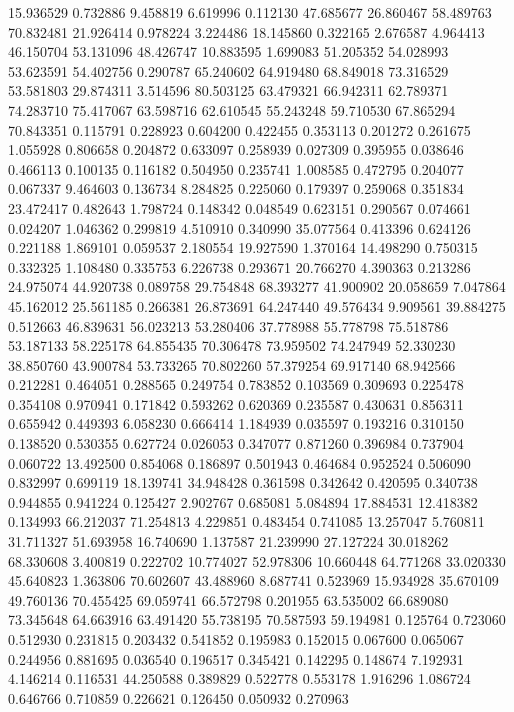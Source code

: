 15.936529
0.732886
9.458819
6.619996
0.112130
47.685677
26.860467
58.489763
70.832481
21.926414
0.978224
3.224486
18.145860
0.322165
2.676587
4.964413
46.150704
53.131096
48.426747
10.883595
1.699083
51.205352
54.028993
53.623591
54.402756
0.290787
65.240602
64.919480
68.849018
73.316529
53.581803
29.874311
3.514596
80.503125
63.479321
66.942311
62.789371
74.283710
75.417067
63.598716
62.610545
55.243248
59.710530
67.865294
70.843351
0.115791
0.228923
0.604200
0.422455
0.353113
0.201272
0.261675
1.055928
0.806658
0.204872
0.633097
0.258939
0.027309
0.395955
0.038646
0.466113
0.100135
0.116182
0.504950
0.235741
1.008585
0.472795
0.204077
0.067337
9.464603
0.136734
8.284825
0.225060
0.179397
0.259068
0.351834
23.472417
0.482643
1.798724
0.148342
0.048549
0.623151
0.290567
0.074661
0.024207
1.046362
0.299819
4.510910
0.340990
35.077564
0.413396
0.624126
0.221188
1.869101
0.059537
2.180554
19.927590
1.370164
14.498290
0.750315
0.332325
1.108480
0.335753
6.226738
0.293671
20.766270
4.390363
0.213286
24.975074
44.920738
0.089758
29.754848
68.393277
41.900902
20.058659
7.047864
45.162012
25.561185
0.266381
26.873691
64.247440
49.576434
9.909561
39.884275
0.512663
46.839631
56.023213
53.280406
37.778988
55.778798
75.518786
53.187133
58.225178
64.855435
70.306478
73.959502
74.247949
52.330230
38.850760
43.900784
53.733265
70.802260
57.379254
69.917140
68.942566
0.212281
0.464051
0.288565
0.249754
0.783852
0.103569
0.309693
0.225478
0.354108
0.970941
0.171842
0.593262
0.620369
0.235587
0.430631
0.856311
0.655942
0.449393
6.058230
0.666414
1.184939
0.035597
0.193216
0.310150
0.138520
0.530355
0.627724
0.026053
0.347077
0.871260
0.396984
0.737904
0.060722
13.492500
0.854068
0.186897
0.501943
0.464684
0.952524
0.506090
0.832997
0.699119
18.139741
34.948428
0.361598
0.342642
0.420595
0.340738
0.944855
0.941224
0.125427
2.902767
0.685081
5.084894
17.884531
12.418382
0.134993
66.212037
71.254813
4.229851
0.483454
0.741085
13.257047
5.760811
31.711327
51.693958
16.740690
1.137587
21.239990
27.127224
30.018262
68.330608
3.400819
0.222702
10.774027
52.978306
10.660448
64.771268
33.020330
45.640823
1.363806
70.602607
43.488960
8.687741
0.523969
15.934928
35.670109
49.760136
70.455425
69.059741
66.572798
0.201955
63.535002
66.689080
73.345648
64.663916
63.491420
55.738195
70.587593
59.194981
0.125764
0.723060
0.512930
0.231815
0.203432
0.541852
0.195983
0.152015
0.067600
0.065067
0.244956
0.881695
0.036540
0.196517
0.345421
0.142295
0.148674
7.192931
4.146214
0.116531
44.250588
0.389829
0.522778
0.553178
1.916296
1.086724
0.646766
0.710859
0.226621
0.126450
0.050932
0.270963
